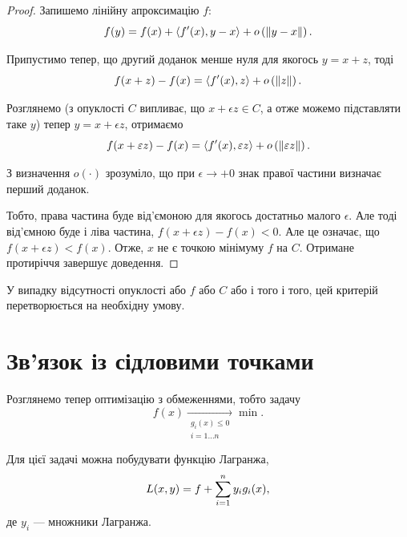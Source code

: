 \begin{proof}
    Запишемо лінійну апроксимацію $f$: 
    \begin{equation}
        f(y) = f(x) + \left\langle f'(x), y - x \right\rangle + o \left( \left\| y - x \right\| \right).
    \end{equation}
    
    Припустимо тепер, що другий доданок менше нуля для якогось $y = x + z$, тоді
    \begin{equation}
        f(x + z) - f(x) = \left\langle f'(x), z \right\rangle + o \left( \left\| z \right\| \right).
    \end{equation}

    Розглянемо (з опуклості $C$ випливає, що $x + \epsilon z \in C$, а отже можемо підставляти таке $y$) тепер $y = x + \epsilon z$, отримаємо
    \begin{equation}
        f(x + \varepsilon z) - f(x) = \left\langle f'(x), \varepsilon z \right\rangle + o \left( \left\| \varepsilon z \right\| \right).
    \end{equation}

    З визначення $o(\cdot)$ зрозуміло, що при $\epsilon \to +0$ знак правої частини визначає перший доданок. \medskip
    
    Тобто, права частина буде від'ємоною для якогось достатньо малого $\epsilon$. Але тоді від'ємною буде і ліва частина, $f(x + \epsilon z) - f(x) < 0$. Але це означає, що $f(x + \epsilon z) < f(x)$. Отже, $x$ не є точкою мінімуму $f$ на $C$. Отримане протиріччя завершує доведення.
\end{proof}

\begin{remark}
    У випадку відсутності опуклості або $f$ або $C$ або і того і того, цей критерій перетворюється на необхідну умову.
\end{remark}


\section{Зв'язок із сідловими точками}

Розглянемо тепер оптимізацію з обмеженнями, тобто задачу
\begin{equation}
    f(x) \xrightarrow[\substack{g_i(x) \le 0 \\ i = 1 \ldots n}]{} \min.
\end{equation}

Для цієї задачі можна побудувати функцію Лагранжа,
\begin{equation}
    L (x, y) = f + \operatorname*{\sum}_{i = 1}^n y_i g_i(x),
\end{equation}
де $y_i$ --- множники Лагранжа. \medskip

